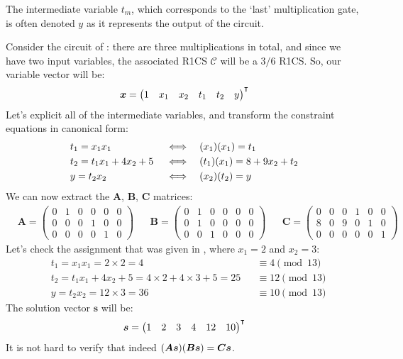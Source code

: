 The intermediate variable \(t_m\), which corresponds to the `last' multiplication gate, is often 
denoted \(y\) as it represents the output of the circuit.
\begin{example}\label{ex:r1cs}
	Consider the circuit of : there are three multiplications in total, 
  and since we have two input variables, the associated R1CS \(\mathcal{C}\) will be a \(3/6\) 
  R1CS\@.
	So, our variable vector will be:
	\[\bm{x} = {\begin{pmatrix}1 & x_1 & x_2 & t_1 & t_2 & y\end{pmatrix}}^{\transpose}\]
  Let's explicit all of the intermediate variables, and transform the constraint equations in 
  canonical form:
	\begin{align*}
		 & {t_1 = x_1x_1} && \iff && {\Parens*{x_1}\Parens*{x_1} = t_1} \\ 
     & {t_2 = t_1x_1 + 4x_2 + 5} && \iff && {\Parens*{t_1}\Parens*{x_1} = 8 + 9x_2 + t_2}\\
     & {y = t_2x_2} && \iff && {\Parens*{x_2}\Parens*{t_2} = y}
	\end{align*}
	We can now extract the \(\bm{A}\), \(\bm{B}\), \(\bm{C}\) matrices:
	\begin{align*}
    &
		\bm{A} =
		\begin{pmatrix}
      0 & 1 & 0 & 0 & 0 & 0 \\
      0 & 0 & 0 & 1 & 0 & 0 \\
      0 & 0 & 0 & 0 & 1 & 0
    \end{pmatrix}
    &&
    \bm{B} =
		\begin{pmatrix}
      0 & 1 & 0 & 0 & 0 & 0 \\
      0 & 1 & 0 & 0 & 0 & 0 \\
      0 & 0 & 1 & 0 & 0 & 0
    \end{pmatrix}
    &&
    \bm{C} =
		\begin{pmatrix}
				0 & 0 & 0 & 1 & 0 & 0 \\
				8 & 0 & 9 & 0 & 1 & 0 \\
				0 & 0 & 0 & 0 & 0 & 1
			\end{pmatrix}
  \end{align*}
  Let's check the assignment that was given in , where \(x_1 = 2\) and 
  \(x_2 = 3\):
	\begin{align*}
		 & t_1 = x_1x_1 = 2 \times 2 = 4                              &  & \equiv  4 \pmod{13} \\
		 & t_2 = t_1x_1 + 4x_2 + 5 = 4 \times 2 + 4 \times 3 + 5 = 25 &  & \equiv 12 \pmod{13} \\
		 & y = t_2x_2 = 12 \times 3 = 36                              &  & \equiv 10 \pmod{13}
	\end{align*}
	The solution vector \(\bm{s}\) will be:
	\[\bm{s} = {\begin{pmatrix}1 & 2 & 3 & 4 & 12 & 10\end{pmatrix}}^{\transpose} \]
	It is not hard to verify that indeed
	\(\Parens*{\bm{A}\bm{s}}\Parens*{\bm{B}\bm{s}} = \bm{C}\bm{s}\).
\end{example}

